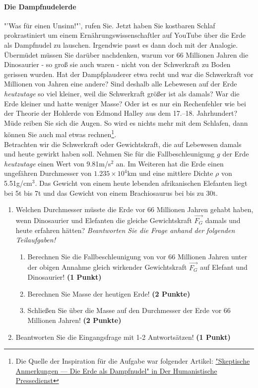 \documentclass[a4paper, 9pt]{scrartcl}\usepackage[]{graphicx}\usepackage[]{xcolor}
\begin{document}
\paragraph{Die Dampfnudelerde}



"'Was für einen Unsinn!"', rufen Sie. Jetzt haben Sie kostbaren Schlaf prokrastiniert um einem Ernährungswissenschaftler auf YouTube über die Erde als Dampfnudel zu lauschen. Irgendwie passt es dann doch mit der Analogie. Übermüdet müssen Sie darüber nachdenken, warum vor 66 Millionen Jahren die Dinosaurier - so groß sie auch waren - nicht von der Schwerkraft zu Boden gerissen wurden. Hat der Dampfplauderer etwa recht und war die Schwerkraft vor Millionen von Jahren eine andere?  Sind deshalb alle Lebewesen auf der Erde \textit{heutzutage} so viel kleiner, weil die Schwerkraft größer ist als damals? War die Erde kleiner und hatte weniger Masse? Oder ist es nur ein Rechenfehler wie bei der Theorie der Hohlerde von Edmond Halley aus dem 17.–18. Jahrhundert? Müde reiben Sie sich die Augen. So wird es nichts mehr mit dem Schlafen, dann können Sie auch mal etwas rechnen\footnote{Die Quelle der Inspiration
  für die Aufgabe war folgender Artikel:
  \href{https://hpd.de/artikel/erde-dampfnudel-22236}{"Skeptische Anmerkungen --- Die Erde als Dampfnudel" in Der Humanistische Pressedienst}}.  \\

Betrachten wir die Schwerkraft oder Gewichtskraft, die auf Lebewesen damals und heute gewirkt haben soll. Nehmen Sie für die Fallbeschleunigung $g$ der Erde \textit{heutzutage} einen Wert von 9.81m/s$^2$ an. Im Weiteren hat die Erde einen ungefähren Durchmesser von \ensuremath{1.235\times 10^{4}}km und eine mittlere Dichte $\rho$ von 5.51g/cm$^3$. Das Gewicht von einem heute lebenden afrikanischen Elefanten liegt bei 5t bis 7t und das Gewicht von einem Brachiosaurus bei bis zu 30t.

\begin{enumerate}
\item Welchen Durchmesser müsste die Erde vor 66 Millionen Jahren gehabt haben, wenn Dinosaurier und Elefanten die gleiche Gewichtskraft $\overrightarrow{F_G}$ damals und heute erfahren hätten? \textit{Beantworten Sie die Frage anhand der folgenden Teilaufgaben!}
\begin{enumerate}
\item Berechnen Sie die Fallbeschleunigung von vor 66 Millionen Jahren unter der obigen Annahme gleich wirkender Gewichtskraft $\overrightarrow{F_G}$ auf Elefant und Dinosaurier! \textbf{(1 Punkt)}
\item Berechnen Sie Masse der heutigen Erde! \textbf{(2 Punkte)}
\item Schließen Sie über die Masse auf den Durchmesser der Erde vor 66 Millionen Jahren! \textbf{(2 Punkte)}
\end{enumerate}
\item Beantworten Sie die Eingangsfrage mit 1-2 Antwortsätzen! \textbf{(1 Punkt)}
\end{enumerate}
\end{document}
